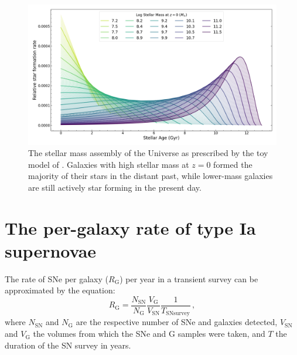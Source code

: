 \documentclass[fleqn,usenatbib]{mnras}
\begin{document}

\begin{figure}
    \centering
    \includegraphics[width=\textwidth]{figs/SFHs_colour.png}
    \caption{The stellar mass assembly of the Universe as prescribed by the toy model of \citet{Childress2014}. Galaxies with high stellar mass at $z=0$ formed the majority of their stars in the distant past, while lower-mass galaxies are still actively star forming in the present day.}
    \label{fig:SFHs}
\end{figure}


\section{The per-galaxy rate of type Ia supernovae}
\label{sec:rates}
The rate of SNe per galaxy ($R_{\mathrm{G}}$) per year in a transient survey can be approximated by the equation:
\begin{equation}
    R_{\mathrm{G}} = \frac{N_{\mathrm{SN}}}{N_{\mathrm{G}}} \frac{V_{\mathrm{G}}}{V_{\mathrm{SN}}}\frac{1}{T_{\mathrm{SN  survey}}}\,,
\label{eq:rate1}
\end{equation}
where $N_{\mathrm{SN}}$ and $N_{\mathrm{G}}$ are the respective number of SNe and galaxies detected, $V_{\mathrm{SN}}$ and $V_{\mathrm{G}}$ the volumes from which the SNe and G samples were taken, and $T$ the duration of the SN survey in years. 
\end{document}
